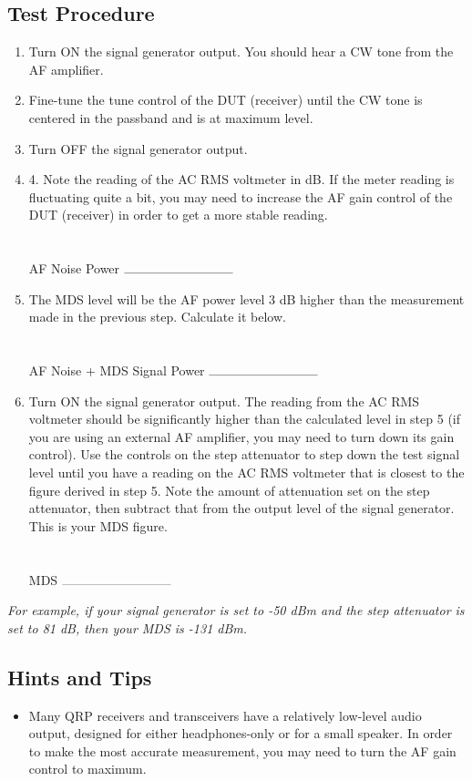\documentclass[10pt,letterpaper]{book}
\begin{document}
\subsection*{Test Procedure}
\begin{enumerate}
	\item Turn ON the signal generator output. You should hear a CW tone from the AF amplifier.
	\item Fine-tune the tune control of the DUT (receiver) until the CW tone is centered in the passband and is at maximum level.
	\item Turn OFF the signal generator output.
	\item 4. Note the reading of the AC RMS voltmeter in dB. If the meter reading is fluctuating quite a bit, you may need to increase the AF gain control of the DUT (receiver) in order to get a more stable reading. \\ \\ \\
	AF Noise Power $\rule{3cm}{0.1mm}$
	\item The MDS level will be the AF power level 3 dB higher than the measurement made in the previous step. Calculate it below. \\ \\ \\
	AF Noise + MDS Signal Power $\rule{3cm}{0.1mm}$
	\item Turn ON the signal generator output. The reading from the AC RMS voltmeter should be significantly higher than the calculated level in step 5 (if you are using an external AF amplifier, you may need to turn down its gain control). Use the controls on the step attenuator to step down the test signal level until you have a reading on the AC RMS voltmeter that is closest to the figure derived in step 5. Note the amount of attenuation set on the step attenuator, then subtract that from the output level of the signal generator. This is your MDS figure. \\ \\ \\ 
	MDS $\rule{3cm}{0.1mm}$
\end{enumerate}
\emph{For example, if your signal generator is set to -50 dBm and the step attenuator is set to 81 dB, then your MDS is -131 dBm.}
\subsection*{Hints and Tips}
\begin{itemize}
	\item Many QRP receivers and transceivers have a relatively low-level audio output, designed for either headphones-only or for a small speaker. In order to make the most accurate measurement, you may need to turn the AF gain control to maximum.
\end{itemize}
\end{document}
